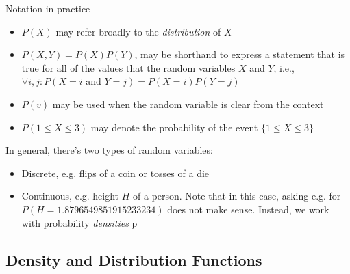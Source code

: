 {    \begin{frame}
        Notation in practice
        \begin{itemize}
            \item $P(X)$ may refer broadly to the \emph{distribution} of $X$
            \item $P(X,Y) = P(X) P(Y)$, may be shorthand to express a statement
                  that is true for all of the values
                  that the random variables $X$ and $Y$, i.e.,
                  $\forall i,j : P(X=i \textrm{ and } Y=j) = P(X=i)P(Y=j)$
            \item $P(v)$ may be used when the random variable is clear from the context
            \item $P(1 \leq X \leq 3)$ may denote the probability of the event $\{1 \leq X \leq 3\}$
        \end{itemize}

        In general, there's two types of random variables:
        \begin{itemize}
            \item Discrete, e.g. flips of a coin or tosses of a die
            \item Continuous, e.g. height $H$ of a person. Note that in this case, asking e.g.
                  for $P(H = 1.8796549851915233234)$ does not make sense. Instead, we work with
                  probability \emph{densities} p
        \end{itemize}

    \end{frame}



    \subsection{Density and Distribution Functions}

}
